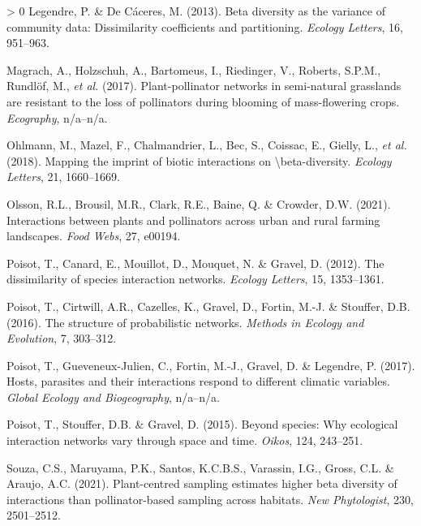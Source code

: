 \documentclass[11pt]{article}
\newlength{\cslhangindent}
\newenvironment{CSLReferences}[3] %
 {%
  \setlength{\parindent}{0pt}
  \ifodd #1 \everypar{\setlength{\hangindent}{\cslhangindent}}\ignorespaces\fi
  \ifnum #2 > 0
  \setlength{\parskip}{#2\baselineskip}
  \fi
 }%
 {}
\begin{document}
\begin{CSLReferences}{1}{0}
\leavevmode\hypertarget{ref-Legendre2013BetDiv}{}%
Legendre, P. \& De Cáceres, M. (2013). Beta diversity as the variance of
community data: Dissimilarity coefficients and partitioning.
\emph{Ecology Letters}, 16, 951--963.

\leavevmode\hypertarget{ref-Magrach2017PlaNet}{}%
Magrach, A., Holzschuh, A., Bartomeus, I., Riedinger, V., Roberts,
S.P.M., Rundlöf, M., \emph{et al.} (2017). Plant-pollinator networks in
semi-natural grasslands are resistant to the loss of pollinators during
blooming of mass-flowering crops. \emph{Ecography}, n/a--n/a.

\leavevmode\hypertarget{ref-Ohlmann2018MapImp}{}%
Ohlmann, M., Mazel, F., Chalmandrier, L., Bec, S., Coissac, E., Gielly,
L., \emph{et al.} (2018). Mapping the imprint of biotic interactions on
\textbackslash beta-diversity. \emph{Ecology Letters}, 21, 1660--1669.

\leavevmode\hypertarget{ref-Olsson2021IntPla}{}%
Olsson, R.L., Brousil, M.R., Clark, R.E., Baine, Q. \& Crowder, D.W.
(2021). Interactions between plants and pollinators across urban and
rural farming landscapes. \emph{Food Webs}, 27, e00194.

\leavevmode\hypertarget{ref-Poisot2012DisSpe}{}%
Poisot, T., Canard, E., Mouillot, D., Mouquet, N. \& Gravel, D. (2012).
The dissimilarity of species interaction networks. \emph{Ecology
Letters}, 15, 1353--1361.

\leavevmode\hypertarget{ref-Poisot2016StrPro}{}%
Poisot, T., Cirtwill, A.R., Cazelles, K., Gravel, D., Fortin, M.-J. \&
Stouffer, D.B. (2016). The structure of probabilistic networks.
\emph{Methods in Ecology and Evolution}, 7, 303--312.

\leavevmode\hypertarget{ref-Poisot2017HosPar}{}%
Poisot, T., Gueveneux-Julien, C., Fortin, M.-J., Gravel, D. \& Legendre,
P. (2017). Hosts, parasites and their interactions respond to different
climatic variables. \emph{Global Ecology and Biogeography}, n/a--n/a.

\leavevmode\hypertarget{ref-Poisot2015SpeWhy}{}%
Poisot, T., Stouffer, D.B. \& Gravel, D. (2015). Beyond species: Why
ecological interaction networks vary through space and time.
\emph{Oikos}, 124, 243--251.

\leavevmode\hypertarget{ref-Souza2021PlaSam}{}%
Souza, C.S., Maruyama, P.K., Santos, K.C.B.S., Varassin, I.G., Gross,
C.L. \& Araujo, A.C. (2021). Plant-centred sampling estimates higher
beta diversity of interactions than pollinator-based sampling across
habitats. \emph{New Phytologist}, 230, 2501--2512.


\end{CSLReferences}
\end{document}

